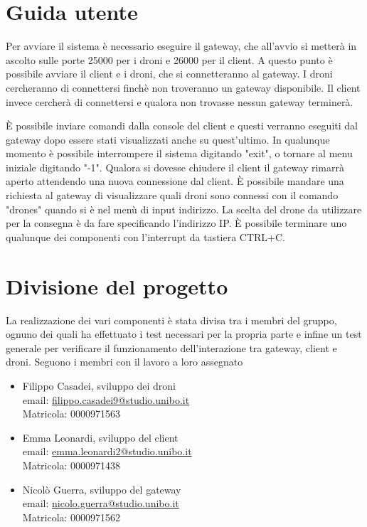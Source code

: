 \documentclass[a4paper,12pt]{report}
\begin{document}
\appendix
\chapter{Guida utente}

Per avviare il sistema è necessario eseguire il gateway, che all'avvio si metterà in ascolto sulle porte 25000 per i droni e 26000 per il client.
A questo punto è possibile avviare il client e i droni, che si connetteranno al gateway. I droni cercheranno di connettersi finchè non troveranno un gateway
disponibile. Il client invece cercherà di connettersi e qualora non trovasse nessun gateway terminerà.

È possibile inviare comandi dalla console del client e questi verranno eseguiti dal gateway dopo essere stati visualizzati anche su quest'ultimo. In qualunque momento è possibile
interrompere il sistema digitando "exit", o tornare al menu iniziale digitando "-1".
Qualora si dovesse chiudere il client il gateway rimarrà aperto attendendo una nuova connessione dal client.
È possibile mandare una richiesta al gateway di visualizzare quali droni sono connessi con il comando "drones" quando si è nel menù di input indirizzo. La scelta del drone da 
utilizzare per la consegna è da fare specificando l'indirizzo IP.
È possibile terminare uno qualunque dei componenti con l'interrupt da tastiera CTRL+C.

\chapter{Divisione del progetto}
La realizzazione dei vari componenti è stata divisa tra i membri del gruppo, ognuno dei quali ha effettuato i test necessari per la propria parte e infine un test generale per
verificare il funzionamento dell'interazione tra gateway, client e droni.
Seguono i membri con il lavoro a loro assegnato
\begin{itemize}
    \item Filippo Casadei, sviluppo dei droni\\ email: \url{filippo.casadei9@studio.unibo.it}\\ Matricola: 0000971563
    \item Emma Leonardi, sviluppo del client\\ email: \url{emma.leonardi2@studio.unibo.it}\\ Matricola: 0000971438
    \item Nicolò Guerra, sviluppo del gateway\\ email: \url{nicolo.guerra@studio.unibo.it} \\ Matricola: 0000971562
\end{itemize}
\end{document}
